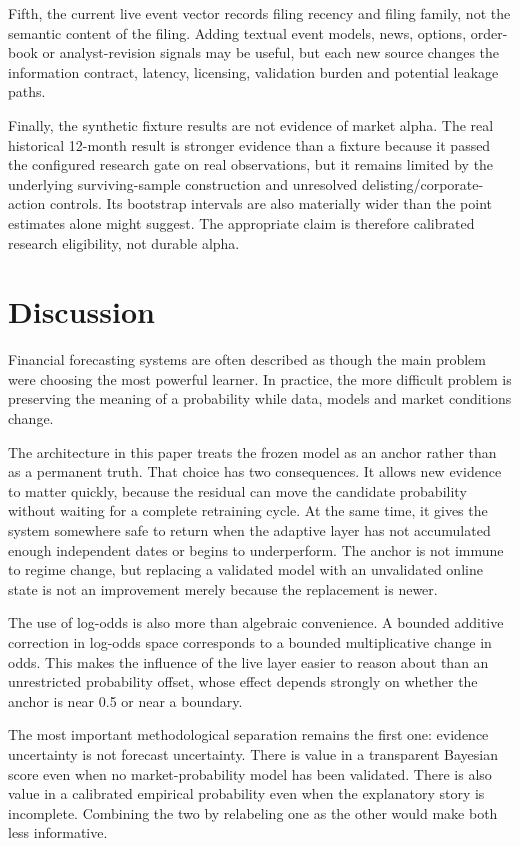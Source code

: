 \documentclass[11pt]{article}
\begin{document}
Fifth, the current live event vector records filing recency and filing family, not the semantic content of the filing. Adding textual event models, news, options, order-book or analyst-revision signals may be useful, but each new source changes the information contract, latency, licensing, validation burden and potential leakage paths.

Finally, the synthetic fixture results are not evidence of market alpha. The real historical 12-month result is stronger evidence than a fixture because it passed the configured research gate on real observations, but it remains limited by the underlying surviving-sample construction and unresolved delisting/corporate-action controls. Its bootstrap intervals are also materially wider than the point estimates alone might suggest. The appropriate claim is therefore calibrated research eligibility, not durable alpha.

\section{Discussion}
\label{sec:discussion}

Financial forecasting systems are often described as though the main problem were choosing the most powerful learner. In practice, the more difficult problem is preserving the meaning of a probability while data, models and market conditions change.

The architecture in this paper treats the frozen model as an anchor rather than as a permanent truth. That choice has two consequences. It allows new evidence to matter quickly, because the residual can move the candidate probability without waiting for a complete retraining cycle. At the same time, it gives the system somewhere safe to return when the adaptive layer has not accumulated enough independent dates or begins to underperform. The anchor is not immune to regime change, but replacing a validated model with an unvalidated online state is not an improvement merely because the replacement is newer.

The use of log-odds is also more than algebraic convenience. A bounded additive correction in log-odds space corresponds to a bounded multiplicative change in odds. This makes the influence of the live layer easier to reason about than an unrestricted probability offset, whose effect depends strongly on whether the anchor is near 0.5 or near a boundary.

The most important methodological separation remains the first one: evidence uncertainty is not forecast uncertainty. There is value in a transparent Bayesian score even when no market-probability model has been validated. There is also value in a calibrated empirical probability even when the explanatory story is incomplete. Combining the two by relabeling one as the other would make both less informative.
\end{document}
